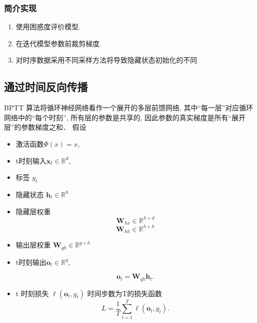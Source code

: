 \documentclass[a4paper]{article}
\theoremstyle{definition}
\numberwithin{equation}{section}
\begin{document}



\subsubsection{简介实现}

\begin{enumerate}
    \item  使用困惑度评价模型. 
    \item  在迭代模型参数前裁剪梯度. 
    \item  对时序数据采用不同采样方法将导致隐藏状态初始化的不同
\end{enumerate}

\subsection{通过时间反向传播}
BPTT 算法将循环神经网络看作一个展开的多层前馈网络, 其中“每一层”对应循环网络中的“每个时刻”, 所有层的参数是共享的, 因此参数的真实梯度是所有“展开层”的参数梯度之和．
假设
\begin{itemize}
\item 激活函数$\Phi(x)=x$, 
\item t时刻输入$\boldsymbol{x}_t \in \mathbb{R}^d$, 
\item 标签 $y_t$
\item 隐藏状态 $\boldsymbol{h}_t \in \mathbb{R}^h$
\item 隐藏层权重 
$$\boldsymbol{W}_{hx} \in \mathbb{R}^{h \times d}$$
$$\boldsymbol{W}_{hh} \in \mathbb{R}^{h \times h}$$
\item 输出层权重
$\boldsymbol{W}_{qh} \in \mathbb{R}^{q \times h}$
\item
t时刻输出$\boldsymbol{o}_t \in \mathbb{R}^q$, 

$$\boldsymbol{o}_t = \boldsymbol{W}_{qh} \boldsymbol{h}_{t}.$$
\item 
t 时刻损失 $\ell(\boldsymbol{o}_t,  y_t)$
时间步数为T的损失函数$$L = \frac{1}{T} \sum_{t=1}^T \ell (\boldsymbol{o}_t,  y_t).$$
\end{itemize}
  
\end{document}
